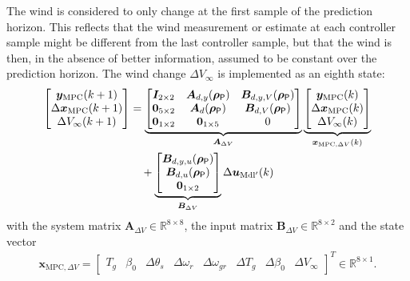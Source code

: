 The wind is considered to only change at the first sample of the prediction horizon. This reflects that the wind measurement or estimate at each controller sample might be different from the last controller sample, but that the wind is then, in the absence of better information, assumed to be constant over the prediction horizon. The wind change $\Delta V_{\infty}$ is implemented as an eighth state:
\begin{equation} \label{eq:AugmentedStateSpace}
    \begin{aligned}
        \begin{bmatrix}
            \bm{y}_{\text{MPC}}(k+1) \\
            \Delta \bm{x}_{\text{MPC}}(k+1) \\
            \Delta V_{\infty}(k+1)
        \end{bmatrix}
        &=
        \underbrace{\begin{bmatrix}
                \bm{I}_{2\times2} & \bm{A}_{d,y}(\bm{\rho}_{\mathsf{P}}) & \bm{B}_{d,y,V}(\bm{\rho}_{\mathsf{P}}) \\
                \bm{0}_{5\times2} & \bm{A}_d(\bm{\rho}_{\mathsf{P}}) & \bm{B}_{d,V}(\bm{\rho}_{\mathsf{P}}) \\
                \bm{0}_{1\times2} & \bm{0}_{1\times5} & 0
        \end{bmatrix}}_{\bm{A}_{\Delta V}}
        \underbrace{\begin{bmatrix}
                \bm{y}_{\text{MPC}}(k) \\
                \Delta \bm{x}_{\text{MPC}}(k) \\
                \Delta V_{\infty}(k)
        \end{bmatrix}}_{\bm{x}_{\text{MPC},\Delta V}(k)} \\
        &\quad +
        \underbrace{
            \begin{bmatrix}
                \bm{B}_{d,y,u}(\bm{\rho}_{\mathsf{P}}) \\
                \bm{B}_{d,u}(\bm{\rho}_{\mathsf{P}}) \\
                \bm{0}_{1\times2}
        \end{bmatrix}}_{\bm{B}_{\Delta V}} \Delta \bm{u}_{\text{Mdl}^\prime}(k)
    \end{aligned}
\end{equation}
with the system matrix $\bm{A}_{\Delta V} \in \mathbb{R}^{8 \times 8}$, the input matrix $\bm{B}_{\Delta V} \in \mathbb{R}^{8 \times 2}$ and the state vector
\begin{align}\label{eq:AugmentedStateVector}
    \bm{x}_{\text{MPC},\Delta V} = \begin{bmatrix} T_g & \beta_0 & \Delta \theta_s & \Delta \omega_r & \Delta \omega_{gr} & \Delta T_g & \Delta \beta_0 & \Delta V_{\infty} \end{bmatrix}^T \in \mathbb{R}^{8 \times 1}.
\end{align}
